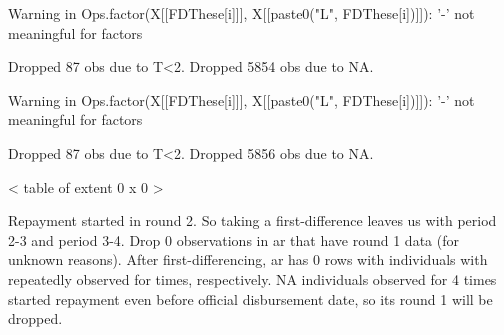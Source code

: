 \begin{Schunk}
\begin{Soutput}
Warning in Ops.factor(X[[FDThese[i]]], X[[paste0("L", FDThese[i])]]): '-' not meaningful for factors
\end{Soutput}
\begin{Soutput}
Dropped 87 obs due to T<2.
Dropped 5854 obs due to NA.
\end{Soutput}
\begin{Soutput}
Warning in Ops.factor(X[[FDThese[i]]], X[[paste0("L", FDThese[i])]]): '-' not meaningful for factors
\end{Soutput}
\begin{Soutput}
Dropped 87 obs due to T<2.
Dropped 5856 obs due to NA.
\end{Soutput}
\begin{Soutput}
< table of extent 0 x 0 >
\end{Soutput}
\end{Schunk}
Repayment started in round 2. So taking a first-difference leaves us with period 2-3 and period 3-4. Drop 0 observations in \textsf{ar} that have round 1 data (for unknown reasons). After first-differencing, \textsf{ar} has 0 rows with  individuals with repeatedly observed for  times, respectively. NA individuals observed for 4 times started repayment even before official disbursement date, so its round 1 will be dropped.

